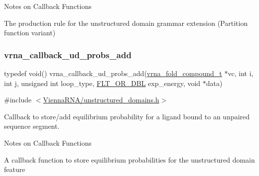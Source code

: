 \begin{DoxyRefDesc}{Notes on Callback Functions}
\item[\hyperlink{callbacks__callbacks000013}{Notes on Callback Functions}]The production rule for the unstructured domain grammar extension (Partition function variant) \end{DoxyRefDesc}
\mbox{\label{group__domains__up_gab10498abc84fcaf336aca8f8d7d42eb2}} 
\subsubsection{\texorpdfstring{vrna\+\_\+callback\+\_\+ud\+\_\+probs\+\_\+add}{vrna\_callback\_ud\_probs\_add}}
{\footnotesize\ttfamily typedef void() vrna\+\_\+callback\+\_\+ud\+\_\+probs\+\_\+add(\hyperlink{group__fold__compound_ga1b0cef17fd40466cef5968eaeeff6166}{vrna\+\_\+fold\+\_\+compound\+\_\+t} $\ast$vc, int i, int j, unsigned int loop\+\_\+type, \hyperlink{group__data__structures_ga31125aeace516926bf7f251f759b6126}{F\+L\+T\+\_\+\+O\+R\+\_\+\+D\+BL} exp\+\_\+energy, void $\ast$data)}



{\ttfamily \#include $<$\hyperlink{unstructured__domains_8h}{Vienna\+R\+N\+A/unstructured\+\_\+domains.\+h}$>$}



Callback to store/add equilibrium probability for a ligand bound to an unpaired sequence segment. 

\begin{DoxyRefDesc}{Notes on Callback Functions}
\item[\hyperlink{callbacks__callbacks000014}{Notes on Callback Functions}]A callback function to store equilibrium probabilities for the unstructured domain feature \end{DoxyRefDesc}
\mbox{\label{group__domains__up_gaa10ba1b6f1e179ea84c5caca9cdaae67}} 
